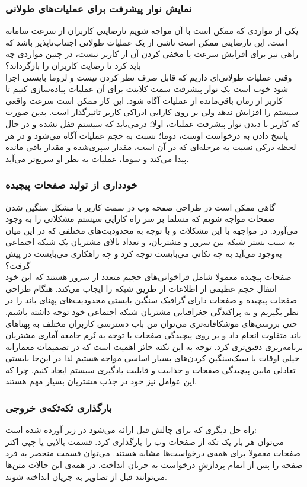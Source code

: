 \subsubsection{نمایش نوار پیشرفت برای عملیات‌های طولانی}
یکی از مواردی که ممکن است با آن مواجه شویم نارضایتی کاربران از سرعت سامانه‌ است. این نارضایتی ممکن است ناشی از یک عملیات طولانی اجتناب‌ناپذیر باشد که راهی نیز برای افزایش سرعت یا مخفی کردن آن از کاربر نیست، در چنین مواردی چه باید کرد تا رضایت کاربران را بازگرداند؟\\
وقتی عملیات طولانی‌ای داریم که قابل صرف نظر کردن نیست و لزوما بایستی اجرا شود خوب است یک نوار پیشرفت سمت کلاینت برای آن عملیات پیاده‌سازی کنیم تا کاربر از زمان باقی‌مانده از عملیات آگاه شود. این کار ممکن است سرعت واقعی سیستم را افزایش ندهد ولی بر روی کارایی ادراکی کاربر تاثیرگذار است. بدین صورت که کاربر با دیدن نوار پیشرفت عملیات، اولا؛ درمی‌یابد که سیستم قفل نشده و در حال پاسخ دادن به درخواست اوست، دوما؛ نسبت به حجم عملیات آگاه می‌شود و در هر لحظه درکی نسبت به مرحله‌ای که در آن است، مقدار سپری‌شده و مقدار باقی مانده پیدا ‌می‌کند و سوما، عملیات به نظر او سریع‌تر می‌آید.

\subsubsection{خودداری از تولید صفحات پیچیده}
گاهی ممکن است در طراحی صفحه وب در سمت کاربر با مشکل سنگین شدن صفحات مواجه شویم که مسلما بر سر راه کارایی سیستم مشکلاتی را به وجود می‌آورد. در مواجهه با این مشکلات و با توجه به محدودیت‌های مختلفی که در این میان به سبب بستر شبکه بین سرور و مشتریان، و تعداد بالای مشتریان یک شبکه اجتماعی به‌وجود می‌آید به چه نکاتی می‌بایست توجه کرد و چه راهکاری می‌بایست در پیش گرفت؟\\
صفحات پیچیده معمولا شامل فراخوانی‌های حجیم متعدد از سرور هستند که این خود انتقال حجم عظیمی از اطلاعات از طریق شبکه را ایجاب می‌کند. هنگام طراحی صفحات پیچیده و صفحات دارای گرافیک سنگین بایستی محدودیت‌های پهنای باند را در نظر بگیریم و به پراکندگی جغرافیایی مشتریان شبکه اجتماعی خود توجه داشته باشیم. حتی بررسی‌های موشکافانه‌تری می‌توان من باب دسترسی کاربران مختلف به پهناهای باند متفاوت انجام داد و بر روی پیچیدگی صفحات با توجه به نُرم جامعه آماری مشتریان برنامه‌ریزی دقیق‌تری کرد. توجه به این نکته حائز اهمیت است که در تصمیمات معمارانه خیلی اوقات با سبک‌سنگین‌ کردن‌های بسیار اساسی مواجه هستیم لذا در این‌جا بایستی تعادلی مابین پیچیدگی صفحات و جذابیت و قابلیت یادگیری سیستم ایجاد کنیم. چرا که این عوامل نیز خود در جذب مشتریان بسیار مهم هستند.

\subsubsection{بارگذاری تکه‌تکه‌ی خروجی}
راه حل دیگری که برای چالش قبل ارائه می‌شود در زیر آورده شده است: \\
 می‌توان هر بار یک تکه از صفحات وب را بارگذاری کرد. قسمت بالایی یا چپی اکثر صفحات معمولا برای همه‌ی درخواست‌ها مشابه‌ هستند. می‌توان قسمت منحصر به فرد صفحه را پس از اتمام پردازشِ درخواست به جریان انداخت. در همه‌ی این حالات متن‌‌ها می‌توانند قبل از تصاویر به جریان انداخته شوند.
 
